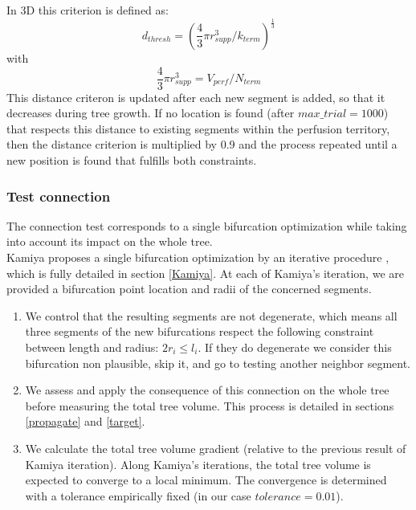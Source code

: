 \documentclass[a4paper, 11pt]{article} %
\begin{document}
In 3D this criterion is defined as:
\begin{equation}
d_{thresh} = (\frac{4}{3} \pi r_{supp}^3 / k_{term})^\frac{1}{3}
\end{equation}
with
\begin{equation}
\frac{4}{3}\pi r_{supp}^3 = V_{perf} / N_{term}
\end{equation}
This distance criteron is updated after each new segment is added, so that it decreases during tree growth. If no location is found (after $max\_trial = 1000$) that respects this distance to existing segments within the perfusion territory, then the distance criterion is multiplied by 0.9 and the process repeated until a new position is found that fulfills both constraints. 

\subsubsection{Test connection}

The connection test corresponds to a single bifurcation optimization while taking into account its impact on the whole tree.\\

Kamiya proposes a single bifurcation optimization by an iterative procedure \cite{kamiya1972optimal}, which is fully detailed in section \ref{Kamiya}. 
At each of Kamiya's iteration, we are provided a bifurcation point location and radii of the concerned segments. 
\begin{enumerate}
\item  We control that the resulting segments are not degenerate, which means all three segments of the new bifurcations respect the following constraint between length and radius: $2r_i \leq l_i$. If they do degenerate we consider this bifurcation non plausible, skip it, and go to testing another neighbor segment.

\item We assess and apply the consequence of this connection on the whole tree before measuring the total tree volume. This process is detailed in sections \ref{propagate} and \ref{target}.

\item We calculate the total tree volume gradient (relative to the previous result of Kamiya iteration).
Along Kamiya's iterations, the total tree volume is expected to converge to a local minimum. The convergence is determined with a tolerance empirically fixed (in our case $tolerance = 0.01$). 

\end{enumerate}
\end{document}
